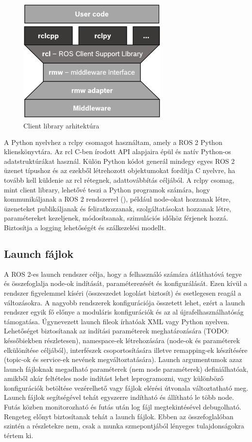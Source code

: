 \begin{figure}[!ht]
    \centering
    \includegraphics[width=75mm, keepaspectratio]{figures/031_rclpy.png}
    \caption{Client library arhitektúra \cite{ros2}}
    \label{fig:031_rclpy}
\end{figure}

A Python nyelvhez a rclpy csomagot használtam, amely a ROS 2 Python klienskönyvtára. Az rcl C-ben írodott API alapjaira épül és natív Python-os adatstruktúrákat használ. Külön Python kódot generál mindegy egyes ROS 2 üzenet típushoz és az ezekből létrehozott objektumokat fordítja C nyelvre, ha tovább kell küldenie az rcl rétegnek, adattovábbítás céljából. A rclpy csomag, mint client library, lehetővé teszi a Python programok számára, hogy kommunikáljanak a ROS 2 rendszerrel (), például node-okat hozzanak létre, üzeneteket publikáljanak és feliratkozzanak, szolgáltatásokat hozzanak létre, paramétereket kezeljenek, módosítsanak, szimulációs időhöz férjenek hozzá. Biztosítja a logging lehetőségét és szálkezelési modellt. \cite{ros2}

\subsection{Launch fájlok}
A ROS 2-es launch rendszer célja, hogy a felhasználó számára átláthatóvá tegye és összefoglalja node-ok indítását, paraméterezését és konfigurálását. Ezen kívül a rendszer figyelemmel kíséri (összeszedet logolást biztosít) és esetlegesen reagál a változásokra. A nagyobb rendszerek konfigurációja összetett lehet, ezért a launch rendszer egyik fő előnye a moduláris konfigurációk és az al újrafelhasználhatóság támogatása. Úgynevezett launch fileok írhatóak XML vagy Python nyelven. Lehetőséget biztosítanak az indítási paraméterek meghatározására (TODO: késsőbiekben részletesen), namespace-ek létrehozására (node-ok és paraméterek elkülönítése céljából), interfészek csoportosítására illetve remapping-ek készítésére (topic-ok és service-ek nevének megváltoztatására). Launch argumentumok azaz launch fájloknak megadható paraméterek (nem node paraméterek) definiálhatóak, amikből akár feltételes node indítást lehet leprogramozni, vagy különböző konfigurációk betöltése vezérelhető vagy fájlok elérési útvonala változtatható meg. Launch fájlok segítségével tehát egyszerre indítható és állítható le több node. Futás közben monitorozható és futás után log fájl megtekintésével debugolható. Rengeteg előnyt biztosítanak tehát a launch fájlok. Ebben az összefoglalóban szintén a részletekre nem, csak a munka szmepontjából lényeges tulajdonságokra tértem ki. \cite{ros2} \cite{ros2_design}

